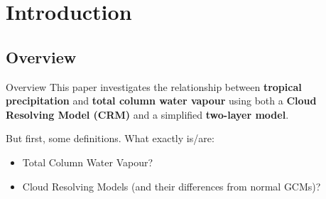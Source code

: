 \section[Introduction]{Introduction}

\subsection{Overview}

\begin{frame}[fragile]{Overview}
    This paper investigates the relationship between \textbf{tropical precipitation} and \textbf{total column water vapour} using both a \textbf{Cloud Resolving Model (CRM)} and a simplified \textbf{two-layer model}.
    
    \pause
    
    But first, some definitions.  What exactly is/are:
    \begin{itemize}
        \pause
        \item Total Column Water Vapour?
        \pause
        \item Cloud Resolving Models (and their differences from normal GCMs)?
    \end{itemize}
\end{frame}